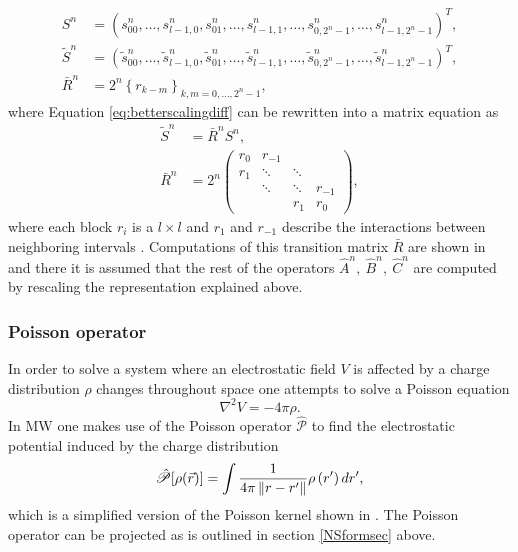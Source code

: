\documentclass[../Thesis.tex]{subfiles}
\begin{document}
\begin{equation}
\begin{aligned}
  S^{n} &=\left( s_{00}^{n}, \ldots, s_{l-1,0}^{n}, s_{01}^{n},
  \ldots, s_{l-1,1}^{n}, \ldots, s_{0,2^{n}-1}^{n}, \ldots, s_{l-1,2^{n}-1}^{n}
  \right)^{T}, \\
  \tilde{S}^{n} &=\left(\tilde{s}_{00}^{n}, \ldots, \tilde{s}_{l-1,0}^{n},
  \tilde{s}_{01}^{n}, \ldots, \tilde{s}_{l-1,1}^{n}, \ldots,
  \tilde{s}_{0,2^{n}-1}^{n}, \ldots, \tilde{s}_{l-1,2^{n}-1}^{n}\right)^{T},\\
  \bar{R}^{n} &=2^{n}\left\{r_{k-m}\right\}_{k, m=0, \ldots, 2^{n}-1},
\end{aligned}
\end{equation}
where Equation \ref{eq:betterscalingdiff} can be rewritten into a matrix equation
as
\begin{align}
\tilde{S}^{n}&=\bar{R}^{n} S^{n},\\
\bar{R}^{n}&=2^{n}
\begin{pmatrix}
  r_0 & r_{-1} &  &  \\
  r_1 & \ddots & \ddots & \\
   & \ddots & \ddots & r_{-1} \\
   & & r_1 & r_0
\end{pmatrix},
\end{align}
where each block $r_i$ is a $l\times l$ and $r_1$ and  $r_{-1}$ describe the interactions
between neighboring intervals \cite{Beylkin1999AdaptiveSO}.
Computations of this transition matrix $\bar{R}$ are shown in \cite{Beylkin1999AdaptiveSO}
and there it is assumed that the rest of the operators $\hat{A}^n,\ \hat{B}^n,\ \hat{C}^n$
are computed by rescaling the representation explained above.

\subsubsection{Poisson operator}
In order to solve a system where an electrostatic field $V$ is affected by a
charge distribution $\rho$ changes throughout space one attempts to solve a Poisson equation
\begin{equation}
  \nabla^2 V = -4\pi \rho.
\end{equation}
In \ac{MW} one makes use of the Poisson operator $\hat{\mathscr{P}}$ to
find the electrostatic potential induced by the charge distribution
\begin{equation}\label{eq:Poissonopmw}
\hat{\mathscr{P}}[\rho(\vec{r})]=\int \frac{1}{4 \pi\left\|r-r^{\prime}\right\|} \rho\left(r^{\prime}\right)
d r^{\prime},
\end{equation}
which is a simplified version of the Poisson kernel shown in \cite{Frediani:2013}.
The Poisson operator can be projected as is outlined in section \ref{NSformsec} above.
\end{document}
